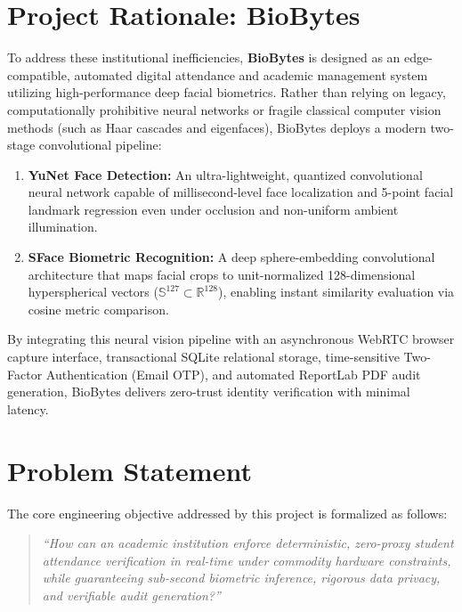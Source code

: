 \documentclass[12pt,a4paper,oneside]{report}
\begin{document}
\section{Project Rationale: BioBytes}
To address these institutional inefficiencies, \textbf{BioBytes} is designed as an edge-compatible, automated digital attendance and academic management system utilizing high-performance deep facial biometrics. Rather than relying on legacy, computationally prohibitive neural networks or fragile classical computer vision methods (such as Haar cascades and eigenfaces), BioBytes deploys a modern two-stage convolutional pipeline:
\begin{enumerate}
    \item \textbf{YuNet Face Detection:} An ultra-lightweight, quantized convolutional neural network capable of millisecond-level face localization and 5-point facial landmark regression even under occlusion and non-uniform ambient illumination.
    \item \textbf{SFace Biometric Recognition:} A deep sphere-embedding convolutional architecture that maps facial crops to unit-normalized 128-dimensional hyperspherical vectors ($\mathbb{S}^{127} \subset \mathbb{R}^{128}$), enabling instant similarity evaluation via cosine metric comparison.
\end{enumerate}

By integrating this neural vision pipeline with an asynchronous WebRTC browser capture interface, transactional SQLite relational storage, time-sensitive Two-Factor Authentication (Email OTP), and automated ReportLab PDF audit generation, BioBytes delivers zero-trust identity verification with minimal latency.

\section{Problem Statement}
The core engineering objective addressed by this project is formalized as follows:
\begin{quote}
\textit{``How can an academic institution enforce deterministic, zero-proxy student attendance verification in real-time under commodity hardware constraints, while guaranteeing sub-second biometric inference, rigorous data privacy, and verifiable audit generation?''}
\end{quote}
\end{document}

